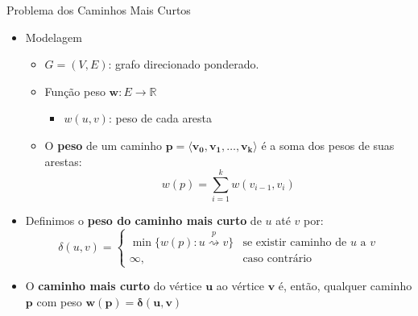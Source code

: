 \documentclass[xcolor=table]{beamer}
\begin{document}
\begin{frame}{Problema dos Caminhos Mais Curtos}
  \begin{itemize}
    \item Modelagem
    \begin{itemize}
      \item $G = (V,E)$: grafo direcionado ponderado.
      \item Função peso $\mathbf{w} : E\rightarrow \mathbb{R}$
      \begin{itemize}
        \item $w(u,v)$: peso de cada aresta
      \end{itemize}
      \item O \textbf{peso} de um caminho $\mathbf{p=\langle v_0,v_1,\dots,v_k\rangle}$ é a soma dos pesos de suas arestas:
      $$w(p) = \sum\limits_{i=1}^{k} w(v_{i-1},v_i)$$
    \end{itemize}
    \item Definimos o \textbf{peso do caminho mais curto} de $u$ até $v$ por:
    \begin{equation}
      \delta(u,v) =
      \begin{cases}
        \min\{w(p):u\stackrel{p}{\rightsquigarrow} v \} & \text{se existir caminho de } u \text{ a } v\\
        \infty, & \text{caso contrário}
      \end{cases}
    \end{equation}
    \item O \textbf{caminho mais curto} do vértice $\mathbf{u}$ ao vértice $\mathbf{v}$ é, então, qualquer caminho $\mathbf{p}$ com peso $\mathbf{w(p) = \delta(u,v)}$
  \end{itemize}
\end{frame}
\end{document}
